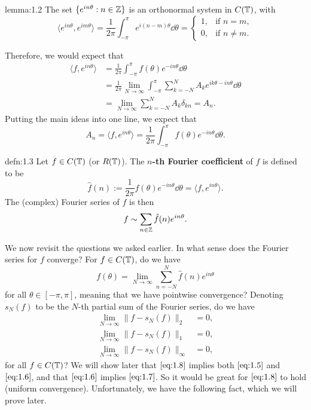\begin{lemma}{lemma:1.2}
    The set $\{e^{in\theta} : n \in \mathbb{Z}\}$ is an orthonormal system in 
    $C(\mathbb{T})$, with 
    \[ \langle e^{in\theta}, e^{im\theta} \rangle = \frac{1}{2\pi} 
    \int_{-\pi}^\pi e^{i(n-m)\theta}\dd\theta = \begin{cases} 
        1, & \text{if } n=m, \\ 
        0, & \text{if } n\neq m.
    \end{cases} \] 
\end{lemma}

Therefore, we would expect that 
\begin{align*}
    \langle f, e^{in\theta} \rangle 
    &= \frac{1}{2\pi} \int_{-\pi}^\pi f(\theta)e^{-in\theta}\dd\theta \\ 
    &= \frac{1}{2\pi} \lim_{N\to\infty} \int_{-\pi}^\pi \sum_{k=-N}^N
    A_k e^{ik\theta - in\theta}\dd\theta \\ 
    &= \lim_{N\to\infty} \sum_{k=-N}^N A_k \delta_{kn} = A_n. 
\end{align*}
Putting the main ideas into one line, we expect that 
\[ A_n = \langle f, e^{in\theta} \rangle = \frac{1}{2\pi} \int_{-\pi}^\pi 
f(\theta)e^{-in\theta}\dd\theta. \] 

\begin{defn}{defn:1.3}
    Let $f \in C(\mathbb{T})$ (or $R(\mathbb{T})$). The {\bf $n$-th Fourier coefficient} of 
    $f$ is defined to be 
    \[ \hat f(n) := \frac{1}{2\pi} f(\theta)e^{-in\theta}\dd\theta = 
    \langle f, e^{in\theta} \rangle. \] 
    The (complex) Fourier series of $f$ is then 
    \[ f \sim \sum_{n\in\mathbb{Z}} \hat f(n)e^{in\theta}. \] 
\end{defn}

We now revisit the questions we asked earlier. In what sense does the 
Fourier series for $f$ converge? For $f \in C(\mathbb{T})$, do we have 
\begin{equation}\label{eq:1.5}
    f(\theta) = \lim_{N\to\infty} \sum_{n=-N}^N \hat f(n)e^{in\theta} 
\end{equation}
for all $\theta \in [-\pi, \pi]$, meaning that we have pointwise convergence? 
Denoting $s_N(f)$ to be the $N$-th partial sum of the Fourier series, do we have 
\begin{align}
    \lim_{N\to\infty} \|f - s_N(f)\|_2 &= 0, \label{eq:1.6} \\ 
    \lim_{N\to\infty} \|f - s_N(f)\|_1 &= 0, \label{eq:1.7} \\ 
    \lim_{N\to\infty} \|f - s_N(f)\|_\infty &= 0, \label{eq:1.8}
\end{align}
for all $f \in C(\mathbb{T})$? We will show later that $\eqref{eq:1.8}$ implies both 
$\eqref{eq:1.5}$ and $\eqref{eq:1.6}$, and that $\eqref{eq:1.6}$ implies 
$\eqref{eq:1.7}$. So it would be great for $\eqref{eq:1.8}$ to hold 
(uniform convergence). Unfortunately, we have the following fact, which 
we will prove later. 


